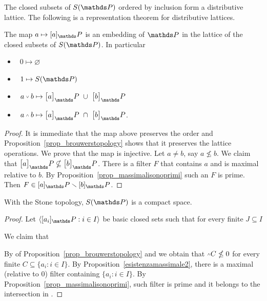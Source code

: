 The closed subsets of $S(\PP)$ ordered by inclusion form a distributive lattice.
The following is a representation theorem for distributive lattices.

\begin{theorem}
The map $a\mapsto [a]_\PP$ is an embedding of $\PP$ in the lattice of the closed subsets of $S(\PP)$.
In particular
\begin{itemize}
\item[1.]\ $0\mapsto \varnothing$
\item[2.]\ $1\mapsto S(\PP)$
\item[3.]\ $a\svee b\mapsto \big[a\big]_\PP\ \cup\ \big[b\big]_\PP$
\item[4.]\ $a\swedge b\mapsto\big[a\big]_\PP\ \cap\ \big[b\big]_\PP$.
\end{itemize}
\end{theorem}

\begin{proof}
It is immediate that the map above preserves the order and Proposition~\ref{prop_brouwerstopology} shows that it preserves the lattice operations.
We prove that the map is injective.
Let $a\neq b$, say  $a\nleq b$.
We claim that $\big[a\big]_\PP\nsubseteq\big[b\big]_\PP$.
There is a filter $F$ that contains $a$ and is maximal relative to $b$.
By Proposition~\ref{prop_massimalisonoprimi} such an $F$ is prime.
Then $F\in [a]_\PP\sm[b]_\PP$.
\end{proof}


\begin{theorem}\label{thm_reticolocompatto}
With the Stone topology, $S(\PP)$ is a compact space.
\end{theorem}
\begin{proof}
Let $\<[a_i]_\PP:i\in I\>$ be basic closed sets such that for every finite $J\subseteq I$


We claim that


By  of Proposition~\ref{prop_brouwerstopology} and  we obtain that $\swedge C\nleq 0$ for every finite $C\subseteq \{a_i:i\in I\}$.
By Proposition~\ref{esistenzamassimale2}, there is a maximal (relative to $0$) filter containing $\{a_i:i\in I\}$.
By Proposition~\ref{prop_massimalisonoprimi}, such filter is prime and it belongs to the intersection in .
\end{proof}

